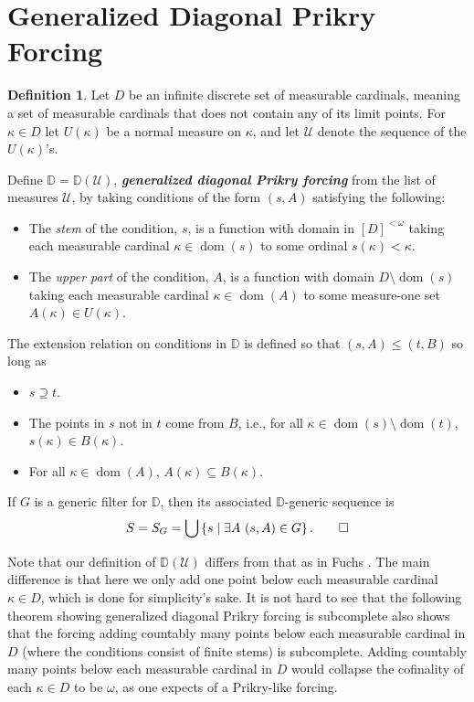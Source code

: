 \documentclass{amsart}
\theoremstyle{definition}
\newtheorem{definition}[theorem]{Definition}
\theoremstyle{remark}
\newcommand{\D}{\mathbb{D}}
\newcommand{\U}{\mathcal{U}}
\DeclareMathOperator{\dom}{dom}
\newcommand{\st}{\; | \;}
\newcommand{\set}[2]{\left\{#1\st #2 \right\}}
\begin{document}
\section{Generalized Diagonal Prikry Forcing}
\label{sec:GenDiagonalPrikryForcing}
\begin{definition}
Let $D$ be an infinite discrete set of measurable cardinals, meaning a set of measurable cardinals that does not contain any of its limit points. For $\kappa \in D$ let $U(\kappa)$ be a normal measure on $\kappa$, and let $\U$ denote the sequence of the $U(\kappa)$'s.

Define $\D=\D(\U)$, \emph{\textbf{generalized diagonal Prikry forcing}} from the list of measures $\U$, by taking conditions of the form  
$( s, A )$ satisfying the following:
\begin{itemize}
	\item The \textit{stem} of the condition, $s$, is a function with domain in $[D]^{<\omega}$ taking each measurable cardinal $\kappa \in \dom(s)$ to some ordinal $s(\kappa) < \kappa$.
	\item The \textit{upper part} of the condition, $A$, is a function with domain $D \setminus {\dom(s)}$ taking each measurable cardinal $\kappa \in \dom(A)$ to some measure-one set $A(\kappa) \in U(\kappa)$.
\end{itemize}
The extension relation on conditions in $\D$ is defined so that $( s, A ) \leq ( t, B )$ so long as 
\begin{itemize}
	\item $s \supseteq t$.
	\item The points in $s$ not in $t$ come from $B$, i.e., for all $\kappa \in \dom(s) \setminus \dom(t)$, $s(\kappa) \in B(\kappa)$.
	\item For all $\kappa \in \dom(A)$, $A(\kappa) \subseteq B(\kappa)$.
\end{itemize}
If $G$ is a generic filter for $\D$, then its associated $\D$-generic sequence is \[S = S_G = \bigcup \set{ s }{ \exists A \ ( s, A ) \in G }.\qedhere\]
\end{definition}

Note that our definition of $\D(\U)$ differs from that as in Fuchs \cite{Fuchs:2005kx}. The main difference is that here we only add one point below each measurable cardinal $\kappa \in D$, which is done for simplicity's sake. It is not hard to see that the following theorem showing generalized diagonal Prikry forcing is subcomplete also shows that the forcing adding countably many points below each measurable cardinal in $D$ (where the conditions consist of finite stems) is subcomplete. Adding countably many points below each measurable cardinal in $D$ would collapse the cofinality of each $\kappa \in D$ to be $\omega$, as one expects of a Prikry-like forcing. %
\end{document}
